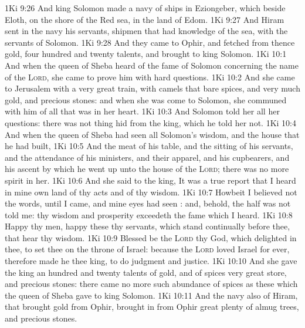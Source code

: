 \vs 1Ki 9:26 And king Solomon made a navy of ships in Eziongeber, which  beside Eloth, on the shore of the Red sea, in the land of Edom.
\vs 1Ki 9:27 And Hiram sent in the navy his servants, shipmen that had knowledge of the sea, with the servants of Solomon.
\vs 1Ki 9:28 And they came to Ophir, and fetched from thence gold, four hundred and twenty talents, and brought  to king Solomon.
\vs 1Ki 10:1 And when the queen of Sheba heard of the fame of Solomon concerning the name of the \textsc{Lord}, she came to prove him with hard questions.
\vs 1Ki 10:2 And she came to Jerusalem with a very great train, with camels that bare spices, and very much gold, and precious stones: and when she was come to Solomon, she communed with him of all that was in her heart.
\vs 1Ki 10:3 And Solomon told her all her questions: there was not  thing hid from the king, which he told her not.
\vs 1Ki 10:4 And when the queen of Sheba had seen all Solomon's wisdom, and the house that he had built,
\vs 1Ki 10:5 And the meat of his table, and the sitting of his servants, and the attendance of his ministers, and their apparel, and his cupbearers, and his ascent by which he went up unto the house of the \textsc{Lord}; there was no more spirit in her.
\vs 1Ki 10:6 And she said to the king, It was a true report that I heard in mine own land of thy acts and of thy wisdom.
\vs 1Ki 10:7 Howbeit I believed not the words, until I came, and mine eyes had seen : and, behold, the half was not told me: thy wisdom and prosperity exceedeth the fame which I heard.
\vs 1Ki 10:8 Happy  thy men, happy  these thy servants, which stand continually before thee,  that hear thy wisdom.
\vs 1Ki 10:9 Blessed be the \textsc{Lord} thy God, which delighted in thee, to set thee on the throne of Israel: because the \textsc{Lord} loved Israel for ever, therefore made he thee king, to do judgment and justice.
\vs 1Ki 10:10 And she gave the king an hundred and twenty talents of gold, and of spices very great store, and precious stones: there came no more such abundance of spices as these which the queen of Sheba gave to king Solomon.
\vs 1Ki 10:11 And the navy also of Hiram, that brought gold from Ophir, brought in from Ophir great plenty of almug trees, and precious stones.
